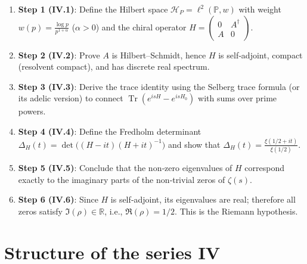 \documentclass[11pt,a4paper]{article}
\begin{document}
\begin{enumerate}
\item \textbf{Step 1 (IV.1)}: Define the Hilbert space $\mathcal{H}_P = \ell^2(\mathbb{P}, w)$ with weight $w(p)=\frac{\log p}{p^{1+\alpha}}$ ($\alpha>0$) and the chiral operator $H = \begin{pmatrix} 0 & A^\dagger \\ A & 0 \end{pmatrix}$.
\item \textbf{Step 2 (IV.2)}: Prove $A$ is Hilbert–Schmidt, hence $H$ is self‑adjoint, compact (resolvent compact), and has discrete real spectrum.
\item \textbf{Step 3 (IV.3)}: Derive the trace identity using the Selberg trace formula (or its adelic version) to connect $\operatorname{Tr}(e^{isH} - e^{isH_0})$ with sums over prime powers.
\item \textbf{Step 4 (IV.4)}: Define the Fredholm determinant $\Delta_H(t) = \det\bigl((H - it)(H + it)^{-1}\bigr)$ and show that $\Delta_H(t) = \frac{\xi(1/2+it)}{\xi(1/2)}$.
\item \textbf{Step 5 (IV.5)}: Conclude that the non‑zero eigenvalues of $H$ correspond exactly to the imaginary parts of the non‑trivial zeros of $\zeta(s)$.
\item \textbf{Step 6 (IV.6)}: Since $H$ is self‑adjoint, its eigenvalues are real; therefore all zeros satisfy $\Im(\rho) \in \mathbb{R}$, i.e., $\Re(\rho)=1/2$. This is the Riemann hypothesis.
\end{enumerate}

\section{Structure of the series IV}
\end{document}
